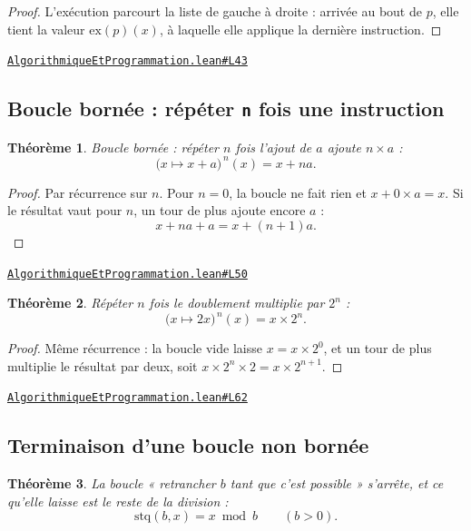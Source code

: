 \documentclass[11pt,a4paper]{article}
\theoremstyle{definition}
\theoremstyle{plain}
\newtheorem{theoreme}{Théorème}
\newcommand{\source}[2]{\par\smallskip\noindent\hfill{\footnotesize\href{#1}{\texttt{#2}}}\par\smallskip}
\begin{document}
\begin{proof}
L'exécution parcourt la liste de gauche à droite : arrivée au bout de $p$, elle tient la
valeur $\mathrm{ex}(p)(x)$, à laquelle elle applique la dernière instruction.
\end{proof}
\source{https://github.com/Commutator-IO/learn-lean/blob/main/courses/01-college/07-algorithmique-et-programmation/AlgorithmiqueEtProgrammation.lean\#L43}{AlgorithmiqueEtProgrammation.lean\#L43}

\subsection{Boucle bornée : répéter \texttt{n} fois une instruction}

\begin{theoreme}
Boucle bornée : répéter $n$ fois l'ajout de $a$ ajoute $n \times a$ :
\[ \bigl(x \mapsto x + a\bigr)^{\,n}(x) = x + na . \]
\end{theoreme}

\begin{proof}
Par récurrence sur $n$. Pour $n = 0$, la boucle ne fait rien et $x + 0 \times a = x$.
Si le résultat vaut pour $n$, un tour de plus ajoute encore $a$ :
\[ x + na + a = x + (n+1)a . \]
\end{proof}
\source{https://github.com/Commutator-IO/learn-lean/blob/main/courses/01-college/07-algorithmique-et-programmation/AlgorithmiqueEtProgrammation.lean\#L50}{AlgorithmiqueEtProgrammation.lean\#L50}

\begin{theoreme}
Répéter $n$ fois le doublement multiplie par $2^n$ :
\[ \bigl(x \mapsto 2x\bigr)^{\,n}(x) = x \times 2^n . \]
\end{theoreme}

\begin{proof}
Même récurrence : la boucle vide laisse $x = x \times 2^0$, et un tour de plus multiplie
le résultat par deux, soit $x \times 2^n \times 2 = x \times 2^{n+1}$.
\end{proof}
\source{https://github.com/Commutator-IO/learn-lean/blob/main/courses/01-college/07-algorithmique-et-programmation/AlgorithmiqueEtProgrammation.lean\#L62}{AlgorithmiqueEtProgrammation.lean\#L62}

\subsection{Terminaison d'une boucle non bornée}

\begin{theoreme}
La boucle « retrancher $b$ tant que c'est possible » s'arrête, et ce qu'elle
laisse est le reste de la division :
\[ \mathrm{stq}(b, x) = x \bmod b \qquad (b > 0) . \]
\end{theoreme}
\end{document}
